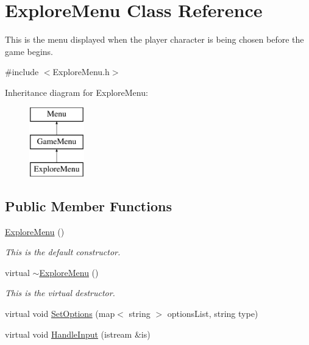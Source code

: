 \hypertarget{classExploreMenu}{\section{Explore\-Menu Class Reference}
\label{classExploreMenu}
}


This is the menu displayed when the player character is being chosen before the game begins.  




{\ttfamily \#include $<$Explore\-Menu.\-h$>$}

Inheritance diagram for Explore\-Menu\-:\begin{figure}[H]
\begin{center}
\leavevmode
\includegraphics[height=3.000000cm]{classExploreMenu}
\end{center}
\end{figure}
\subsection*{Public Member Functions}
\begin{DoxyCompactItemize}
\item 
\hypertarget{classExploreMenu_ac05a4f8e2972f1617a702e04677f241b}{\hyperlink{classExploreMenu_ac05a4f8e2972f1617a702e04677f241b}{Explore\-Menu} ()}\label{classExploreMenu_ac05a4f8e2972f1617a702e04677f241b}

\begin{DoxyCompactList}\small\item\em This is the default constructor. \end{DoxyCompactList}\item 
\hypertarget{classExploreMenu_ab729e66a74a835cac6d0c1397ee9fca4}{virtual \hyperlink{classExploreMenu_ab729e66a74a835cac6d0c1397ee9fca4}{$\sim$\-Explore\-Menu} ()}\label{classExploreMenu_ab729e66a74a835cac6d0c1397ee9fca4}

\begin{DoxyCompactList}\small\item\em This is the virtual destructor. \end{DoxyCompactList}\item 
virtual void \hyperlink{classExploreMenu_a916408504bfc970370d199745f17b252}{Set\-Options} (map$<$ string $>$ options\-List, string type)
\item 
virtual void \hyperlink{classExploreMenu_a6f057968d2aece06eef01b9da9b42c2d}{Handle\-Input} (istream \&is)
\end{DoxyCompactItemize}
